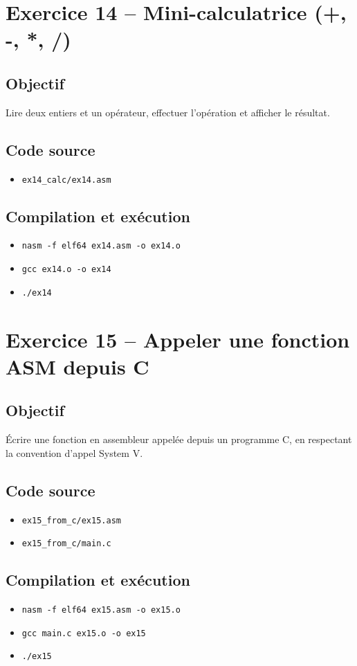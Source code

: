 \documentclass[11pt]{article}
\begin{document}
\section{Exercice 14 -- Mini-calculatrice (+, -, *, /)}
\subsection*{Objectif}
Lire deux entiers et un opérateur, effectuer l'opération et afficher le résultat.

\subsection*{Code source}
\begin{itemize}[noitemsep]
    \item \texttt{ex14\_calc/ex14.asm}
\end{itemize}

\subsection*{Compilation et exécution}
\begin{itemize}[noitemsep]
    \item \texttt{nasm -f elf64 ex14.asm -o ex14.o}
    \item \texttt{gcc ex14.o -o ex14}
    \item \texttt{./ex14}
\end{itemize}

\section{Exercice 15 -- Appeler une fonction ASM depuis C}
\subsection*{Objectif}
Écrire une fonction en assembleur appelée depuis un programme C, en respectant la convention d'appel System V.

\subsection*{Code source}
\begin{itemize}[noitemsep]
    \item \texttt{ex15\_from\_c/ex15.asm}
    \item \texttt{ex15\_from\_c/main.c}
\end{itemize}

\subsection*{Compilation et exécution}
\begin{itemize}[noitemsep]
    \item \texttt{nasm -f elf64 ex15.asm -o ex15.o}
    \item \texttt{gcc main.c ex15.o -o ex15}
    \item \texttt{./ex15}
\end{itemize}
\end{document}
